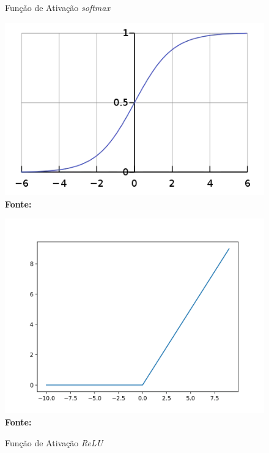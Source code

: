 \begin{figure}[ht]
\centering
\begin{minipage}{0.45\textwidth}
  \centering
  \caption[\hspace{0.1cm}Grade Computacional.]{Função de Ativação \textit{softmax}}
  \vspace{-0.4cm}
  \includegraphics[width=\linewidth]{figuras/softmax.png}
  \captionsetup{justification=centering}
  \vspace{-0.2cm}
  \\\textbf{\footnotesize Fonte: \cite{softmax}}
  \label{fig:softmax}
\end{minipage}\hfill
\begin{minipage}{0.45\textwidth}
  \centering
  \caption[\hspace{0.1cm}Grade Computacional.]{Função de Ativação \textit{ReLU}}
  \vspace{-0.4cm}
  \includegraphics[width=\linewidth]{figuras/relu.png}
  \captionsetup{justification=centering}
  \vspace{-0.2cm}
  \\\textbf{\footnotesize Fonte: \cite{relu}}
  \label{fig:relu}
\end{minipage}
\end{figure}

